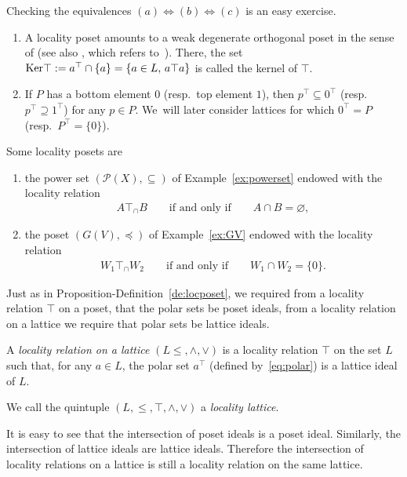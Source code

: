 \documentclass[pdftex]{sigma}
\numberwithin{equation}{section}
\newcommand{\loc}{locality\xspace}
\begin{document}
Checking the equivalences $(a)\Leftrightarrow (b)\Leftrightarrow (c)$ is an easy exercise.

\begin{Remark}\qquad
\begin{enumerate}\itemsep=0pt
\item[$(a)$] A locality poset %
amounts to a weak degenerate orthogonal poset in the sense of \cite[Defi\-nition 2.1]{CM} (see also \cite[supplementary Remark~6 in~Section~16]{K}, which refers to~\cite{Sz1}). There, the set ${\rm Ker} \top:=a^\top\cap \{a\}=\{a\in L, \, a\top a\}$ is called the kernel of $\top$.
\item[$(b)$] If $P$ has a bottom element $0$ (resp.~top element $1$), then $p^\top\subseteq 0^\top $ (resp.~$p^\top\supseteq 1^\top $) for any $p\in P$. We~will later consider lattices for which $0^\top=P$ (resp.~$P^\top=\{0\}$).
\end{enumerate}
\end{Remark}

{\samepage\begin{Example} \label{ex:locposetex}
Some locality posets %
are
\begin{enumerate}\itemsep=0pt
\item[$(a)$] the power set $\left({\mathcal P}(X), \subseteq \right)$ of Example~\ref{ex:powerset} endowed with the \loc relation
	\begin{gather*}
	A\top_\cap B\qquad\text{if and only if}\qquad A\cap B=\varnothing,
	\end{gather*}
\item[$(b)$] the \subsp poset $(G(V), \preceq)$ of Example~\ref{ex:GV}
	endowed with the \loc relation
	\begin{gather*}
	W_1\top_\cap W_2\qquad\text{if and only if}\qquad W_1\cap W_2=\{0\}.
	\end{gather*}
\end{enumerate}
	\end{Example}

}

Just as in Proposition-Definition~\ref{de:locposet}, we required from a locality relation $\top$ on a poset, that the polar sets be poset ideals, from a locality relation on a lattice we require that polar sets be lattice ideals.

\begin{Definition} \label{def:loclattice} A {\it \loc relation on a lattice} $(L\leq,\wedge,\vee)$ is a \loc relation $\top$ on the set $L$ such that, for any $a\in L$, the polar set $a^\top$ (defined by~\eqref{eq:polar}) is a lattice ideal of $L$.

	We call the
quintuple $(L, \leq, \top, \wedge, \vee) $ a {\it \loc lattice}.
\end{Definition}
\begin{Remark} %
 It is easy to see that the intersection of poset ideals is a poset ideal. Similarly, the intersection of lattice ideals are lattice ideals. Therefore the intersection of locality relations on a lattice is still a locality relation on the same lattice.
 \end{Remark}
\end{document}

